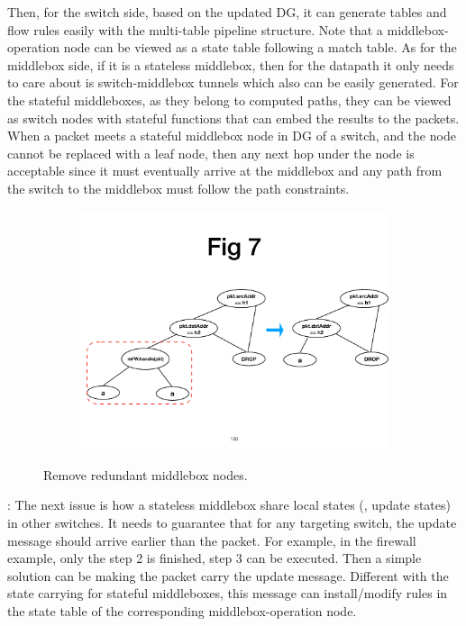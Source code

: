 Then, for the switch side, based on the updated DG, it can generate tables and flow rules easily with the multi-table pipeline structure. Note that a middlebox-operation node can be viewed as a state table following a match table. As for the middlebox side, if it is a stateless middlebox, then for the datapath it only needs to care about is switch-middlebox tunnels which also can be easily generated. For the stateful middleboxes, as they belong to computed paths, they can be viewed as switch nodes with stateful functions that can embed the results to the packets. When a packet meets a stateful middlebox node in DG of a switch, and the node cannot be replaced with a leaf node, then any next hop under the node is acceptable since it must eventually arrive at the middlebox and any path from the switch to the middlebox must follow the path constraints.

\begin{figure}[!htbp]
\centering
\begin{subfigure}{0.8\linewidth}
      \centering\includegraphics[width=\linewidth]{figures/ss-130.pdf}
\end{subfigure}
\vspace{-2mm}
\caption{\small Remove redundant middlebox nodes.}
\label{fig:rv}
\end{figure}

: The next issue is how a stateless middlebox share local states (\ie, update states) in other switches. It needs to guarantee that for any targeting switch, the update message should arrive earlier than the packet. For example, in the firewall example, only the step 2 is finished, step 3 can be executed. Then a simple solution can be making the packet carry the update message. Different with the state carrying for stateful middleboxes, this message can install/modify rules in the state table of the corresponding middlebox-operation node.





